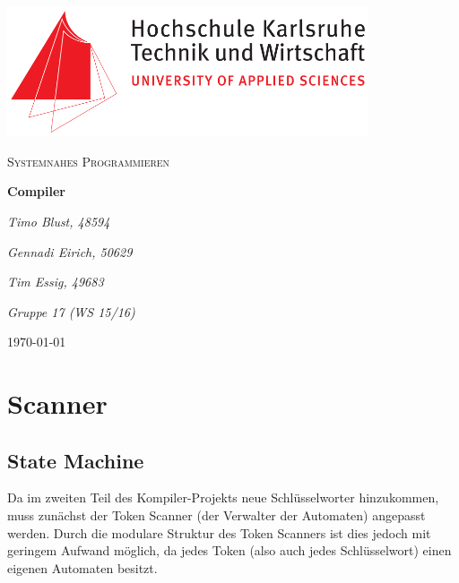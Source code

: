 \documentclass[
	a4paper
]{scrreprt}
\begin{document}
\sffamily %


\begin{titlepage}
	\centering
	\includegraphics[width=0.8\textwidth]{./images/logo_hska.png}\par\vspace{1cm}
	\vspace{1cm}
	
	{\scshape\Large Systemnahes Programmieren\par}
	\vspace{1.5cm}
	
	{\huge\textbf{Compiler}\par}
	\vspace{2cm}
	
	{\Large\itshape Timo Blust, 48594\par}
	{\Large\itshape Gennadi Eirich, 50629\par}
	{\Large\itshape Tim Essig, 49683\par\par}
	\vspace{2cm}
	
	{\Large\itshape Gruppe 17 (WS 15/16)\par}
	
	\vfill

	{\large \today\par}
\end{titlepage}


\tableofcontents

\chapter{Scanner}
\section{State Machine}
Da im zweiten Teil des Kompiler-Projekts neue Schlüsselworter hinzukommen, muss zunächst der Token Scanner (der Verwalter der Automaten) angepasst werden. Durch die modulare Struktur des Token Scanners ist dies jedoch mit geringem Aufwand möglich, da jedes Token (also auch jedes Schlüsselwort) einen eigenen Automaten besitzt.
\end{document}
